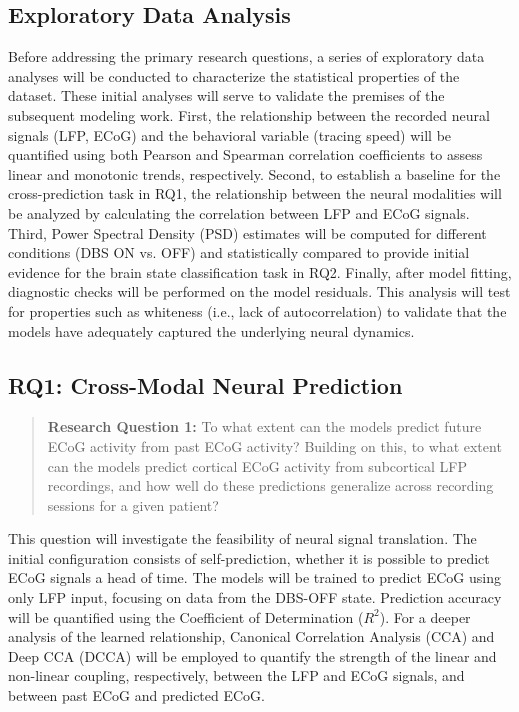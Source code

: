 \documentclass[12pt, a4paper]{article}
\begin{document}
\subsection{Exploratory Data Analysis}
Before addressing the primary research questions, a series of exploratory data analyses will be conducted to characterize the statistical properties of the dataset. These initial analyses will serve to validate the premises of the subsequent modeling work. First, the relationship between the recorded neural signals (LFP, ECoG) and the behavioral variable (tracing speed) will be quantified using both Pearson and Spearman correlation coefficients to assess linear and monotonic trends, respectively. Second, to establish a baseline for the cross-prediction task in RQ1, the relationship between the neural modalities will be analyzed by calculating the correlation between LFP and ECoG signals. Third, Power Spectral Density (PSD) estimates will be computed for different conditions (DBS ON vs. OFF) and statistically compared to provide initial evidence for the brain state classification task in RQ2. Finally, after model fitting, diagnostic checks will be performed on the model residuals. This analysis will test for properties such as whiteness (i.e., lack of autocorrelation) to validate that the models have adequately captured the underlying neural dynamics.

\subsection{RQ1: Cross-Modal Neural Prediction}
\begin{quote}
    \textbf{Research Question 1:} To what extent can the models predict future ECoG activity from past ECoG activity? Building on this, to what extent can the models predict cortical ECoG activity from subcortical LFP recordings, and how well do these predictions generalize across recording sessions for a given patient?
\end{quote}

This question will investigate the feasibility of neural signal translation. The initial configuration consists of self-prediction, whether it is possible to predict ECoG signals a head of time. The models will be trained to predict ECoG using only LFP input, focusing on data from the DBS-OFF state. Prediction accuracy will be quantified using the Coefficient of Determination ($R^2$). For a deeper analysis of the learned relationship, Canonical Correlation Analysis (CCA) and Deep CCA (DCCA) will be employed to quantify the strength of the linear and non-linear coupling, respectively, between the LFP and ECoG signals, and between past ECoG and predicted ECoG.
\end{document}
